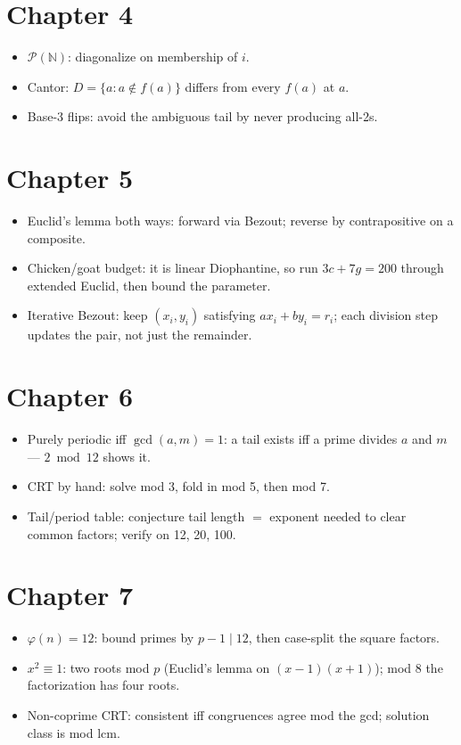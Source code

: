\section*{Chapter 4}
\begin{itemize}
\item $\mathcal P(\mathbb N)$: diagonalize on membership of $i$.
\item Cantor: $D=\{a:a\notin f(a)\}$ differs from every $f(a)$ at $a$.
\item Base-3 flips: avoid the ambiguous tail by never producing all-2s.
\end{itemize}

\section*{Chapter 5}
\begin{itemize}
\item Euclid's lemma both ways: forward via Bezout; reverse by
contrapositive on a composite.
\item Chicken/goat budget: it is linear Diophantine, so run
$3c+7g=200$ through extended Euclid, then bound the parameter.
\item Iterative Bezout: keep $(x_i,y_i)$ satisfying $ax_i+by_i=r_i$;
each division step updates the pair, not just the remainder.
\end{itemize}

\section*{Chapter 6}
\begin{itemize}
\item Purely periodic iff $\gcd(a,m)=1$: a tail exists iff a prime
divides $a$ and $m$ --- $2\bmod{12}$ shows it.
\item CRT by hand: solve mod 3, fold in mod 5, then mod 7.
\item Tail/period table: conjecture tail length $=$ exponent needed to
clear common factors; verify on 12, 20, 100.
\end{itemize}

\section*{Chapter 7}
\begin{itemize}
\item $\varphi(n)=12$: bound primes by $p-1\mid12$, then case-split the
square factors.
\item $x^2\equiv1$: two roots mod $p$ (Euclid's lemma on
$(x-1)(x+1)$); mod 8 the factorization has four roots.
\item Non-coprime CRT: consistent iff congruences agree mod the gcd;
solution class is mod lcm.
\end{itemize}

